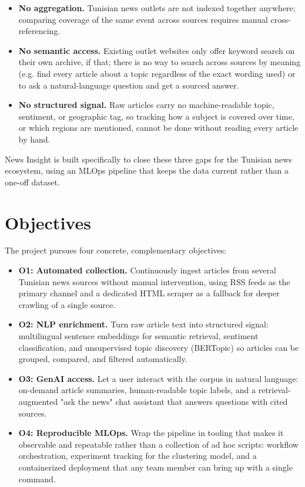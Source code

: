 \begin{itemize}
    \item \textbf{No aggregation.} Tunisian news outlets are not indexed together anywhere; comparing coverage of the same event across sources requires manual cross-referencing.
    \item \textbf{No semantic access.} Existing outlet websites only offer keyword search on their own archive, if that; there is no way to search across sources by meaning (e.g. find every article about a topic regardless of the exact wording used) or to ask a natural-language question and get a sourced answer.
    \item \textbf{No structured signal.} Raw articles carry no machine-readable topic, sentiment, or geographic tag, so tracking how a subject is covered over time, or which regions are mentioned, cannot be done without reading every article by hand.
\end{itemize}

News Insight is built specifically to close these three gaps for the Tunisian news ecosystem, using an MLOps pipeline that keeps the data current rather than a one-off dataset.

\section{Objectives}
The project pursues four concrete, complementary objectives:

\begin{itemize}
    \item \textbf{O1: Automated collection.} Continuously ingest articles from several Tunisian news sources without manual intervention, using RSS feeds as the primary channel and a dedicated HTML scraper as a fallback for deeper crawling of a single source.
    \item \textbf{O2: NLP enrichment.} Turn raw article text into structured signal: multilingual sentence embeddings for semantic retrieval, sentiment classification, and unsupervised topic discovery (BERTopic) so articles can be grouped, compared, and filtered automatically.
    \item \textbf{O3: GenAI access.} Let a user interact with the corpus in natural language: on-demand article summaries, human-readable topic labels, and a retrieval-augmented "ask the news" chat assistant that answers questions with cited sources.
    \item \textbf{O4: Reproducible MLOps.} Wrap the pipeline in tooling that makes it observable and repeatable rather than a collection of ad hoc scripts: workflow orchestration, experiment tracking for the clustering model, and a containerized deployment that any team member can bring up with a single command.
\end{itemize}


